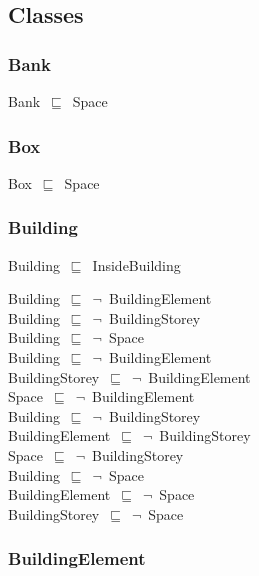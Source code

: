 \documentclass{article}
\begin{document}
\subsection*{Classes}

\subsubsection*{Bank}

Bank~\ensuremath{\sqsubseteq}~Space~

\subsubsection*{Box}

Box~\ensuremath{\sqsubseteq}~Space~

\subsubsection*{Building}

Building~\ensuremath{\sqsubseteq}~InsideBuilding~

Building~\ensuremath{\sqsubseteq}~\ensuremath{\lnot}~BuildingElement\\
Building~\ensuremath{\sqsubseteq}~\ensuremath{\lnot}~BuildingStorey\\
Building~\ensuremath{\sqsubseteq}~\ensuremath{\lnot}~Space\\
Building~\ensuremath{\sqsubseteq}~\ensuremath{\lnot}~BuildingElement\\
BuildingStorey~\ensuremath{\sqsubseteq}~\ensuremath{\lnot}~BuildingElement\\
Space~\ensuremath{\sqsubseteq}~\ensuremath{\lnot}~BuildingElement\\
Building~\ensuremath{\sqsubseteq}~\ensuremath{\lnot}~BuildingStorey\\
BuildingElement~\ensuremath{\sqsubseteq}~\ensuremath{\lnot}~BuildingStorey\\
Space~\ensuremath{\sqsubseteq}~\ensuremath{\lnot}~BuildingStorey\\
Building~\ensuremath{\sqsubseteq}~\ensuremath{\lnot}~Space\\
BuildingElement~\ensuremath{\sqsubseteq}~\ensuremath{\lnot}~Space\\
BuildingStorey~\ensuremath{\sqsubseteq}~\ensuremath{\lnot}~Space\\


\subsubsection*{BuildingElement}
\end{document}

